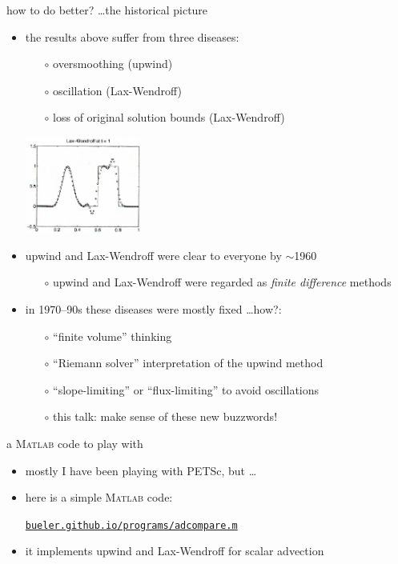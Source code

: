 \documentclass[10pt,hyperref,dvipsnames]{beamer}
\newcommand{\Matlab}{\textsc{Matlab}\xspace}
\begin{document}
\begin{frame}{how to do better? \dots the historical picture}

\begin{itemize}
\item the results above suffer from three diseases:
    \begin{itemize}
    \item[$\circ$] \alert{oversmoothing} (upwind)
    \item[$\circ$] \alert{oscillation} (Lax-Wendroff)
    \item[$\circ$] \alert{loss of original solution bounds} (Lax-Wendroff)
    \end{itemize}

\vspace{-15mm}

\hfill \includegraphics[width=0.3\textwidth]{figs/leveque6p1lw}

\bigskip
\item upwind and Lax-Wendroff were clear to everyone by $\sim$1960
    \begin{itemize}
    \item[$\circ$] upwind and Lax-Wendroff were regarded as \emph{finite difference} methods
    \end{itemize}
\item in 1970--90s these diseases were mostly fixed \dots how?:
    \begin{itemize}
    \item[$\circ$] ``finite volume'' thinking
    \item[$\circ$] ``Riemann solver'' interpretation of the upwind method
    \item[$\circ$] ``slope-limiting'' or ``flux-limiting'' to avoid oscillations
    \item[$\circ$] this talk: make sense of these new buzzwords!
    \end{itemize}
\end{itemize}
\end{frame}


\begin{frame}{a \Matlab code to play with}

\begin{itemize}
\item mostly I have been playing with PETSc, but \dots
\item here is a simple \Matlab code:

\begin{center}
\href{http://bueler.github.io/programs/adcompare.m}{\texttt{bueler.github.io/programs/adcompare.m}}
\end{center}
\item it implements upwind and Lax-Wendroff for scalar advection
\end{itemize}
\end{frame}
\end{document}
